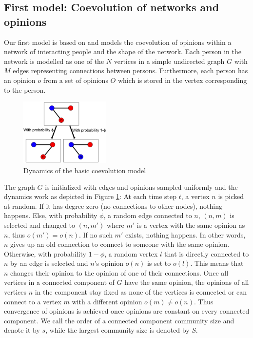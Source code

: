 \documentclass[11pt]{article}
\begin{document}
\subsection{First model: Coevolution of networks and opinions}\label{holme}
Our first model is based on \citet{holme2006nonequilibrium} and models the coevolution of opinions within a network of interacting people and the shape of the network. Each person in the network is modelled as one of the $N$ vertices in a simple undirected graph $G$ with $M$ edges representing connections between persons. Furthermore, each person has an opinion $o$ from a set of opinions $O$ which is stored in the vertex corresponding to the person.
\begin{figure}[h]

\begin{center}
\includegraphics[width=0.4\textwidth]{coevo.png}
\end{center}
\caption{Dynamics of the basic coevolution model}
\label{Coevo}
\end{figure}
The graph $G$ is initialized with edges and opinions sampled uniformly and the dynamics work as depicted in Figure \ref{Coevo}: At each time step $t$, a vertex $n$ is picked at random. If it has degree zero (no connections to other nodes), nothing happens. Else, with probability $\phi$, a random edge connected to $n$, $(n,m)$ is selected and changed to $(n,m')$ where $m'$ is a vertex with the same opinion as $n$, thus $o(m')=o(n)$. If no such $m'$ exists, nothing happens. In other words, $n$ gives up an old connection to connect to someone with the same opinion. Otherwise, with probability $1-\phi$, a random vertex $l$ that is directly connected to $n$ by an edge is selected and $n$'s opinion $o(n)$ is set to $o(l)$. This means that $n$ changes their opinion to the opinion of one of their connections. Once all vertices in a connected component of $G$ have the same opinion, the opinions of all vertices $n$ in the component stay fixed as none of the vertices is connected or can connect to a vertex $m$ with a different opinion $o(m)\neq o(n)$. Thus convergence of opinions is achieved once opinions are constant on every connected component. We call the order of a connected component community size and denote it by $s$, while the largest community size is denoted by $S$.
\end{document}

